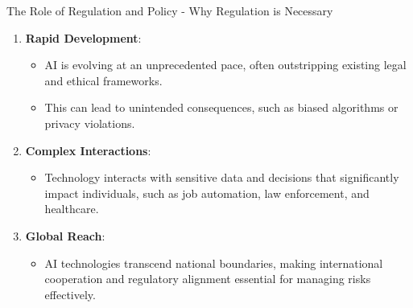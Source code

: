 \documentclass[aspectratio=169]{beamer}
\begin{document}
\begin{frame}[fragile]{The Role of Regulation and Policy - Why Regulation is Necessary}
    \begin{enumerate}
        \item \textbf{Rapid Development}:
        \begin{itemize}
            \item AI is evolving at an unprecedented pace, often outstripping existing legal and ethical frameworks.
            \item This can lead to unintended consequences, such as biased algorithms or privacy violations.
        \end{itemize}
        
        \item \textbf{Complex Interactions}:
        \begin{itemize}
            \item Technology interacts with sensitive data and decisions that significantly impact individuals, such as job automation, law enforcement, and healthcare.
        \end{itemize}
        
        \item \textbf{Global Reach}:
        \begin{itemize}
            \item AI technologies transcend national boundaries, making international cooperation and regulatory alignment essential for managing risks effectively.
        \end{itemize}
    \end{enumerate}
\end{frame}
\end{document}
